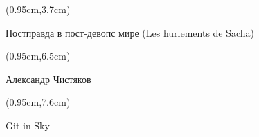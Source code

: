 \documentclass[xetex,18pt,aspectratio=43]{beamer}
\title[Постправда в пост-девопс мире]{}
\author[Александр Чистяков, Git in Sky]{}
\date{}
\newcommand\Bigfont{\fontsize{20}{20}\selectfont}
\newcommand\Authorfont{\fontsize{17}{17}\selectfont}
\newcommand\Orgfont{\fontsize{13}{13}\selectfont}
\begin{document}
{ %
    \begin{frame}[plain]
      \begin{textblock*}{\framewidth}(0.95cm,3.7cm) %
        \Bigfont
          \begin{center}
          Постправда в пост-девопс мире (Les hurlements de Sacha)
          \end{center}
      \end{textblock*}
      \begin{textblock*}{\framewidth}(0.95cm,6.5cm) %
        \Authorfont
          \begin{center}
          Александр Чистяков
          \end{center}
      \end{textblock*}
      \begin{textblock*}{\framewidth}(0.95cm,7.6cm) %
        \Orgfont
          \begin{center}
          Git in Sky
          \end{center}
      \end{textblock*}
     \end{frame}
}
\end{document}
